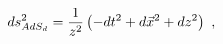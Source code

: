 \begin{equation}
ds_{AdS_d}^2={1\over z^2}\left(-dt^2+d\vec{x}^2+dz^2\right)\ ,
\label{adsnine}
\end{equation}

